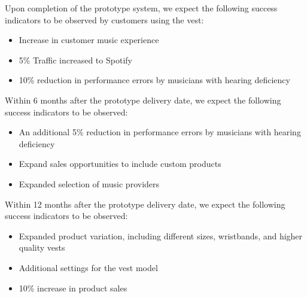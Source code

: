 

Upon completion of the prototype system, we expect the following success indicators to be observed by customers using the vest:
\begin{itemize}
  \item Increase in customer music experience 
  \item 5\% Traffic increased to Spotify 
  \item 10\% reduction in performance errors by musicians with hearing deficiency
\end{itemize}

Within 6 months after the prototype delivery date, we expect the following success indicators to be observed:
\begin{itemize}
  \item An additional 5\% reduction in performance errors by musicians with hearing deficiency
  \item Expand sales opportunities to include custom products
  \item Expanded selection of music providers
\end{itemize}

Within 12 months after the prototype delivery date, we expect the following success indicators to be observed:
\begin{itemize}
  \item Expanded product variation, including different sizes, wristbands, and higher quality vests
  \item Additional settings for the vest model 
  \item 10\% increase in product sales
\end{itemize}


